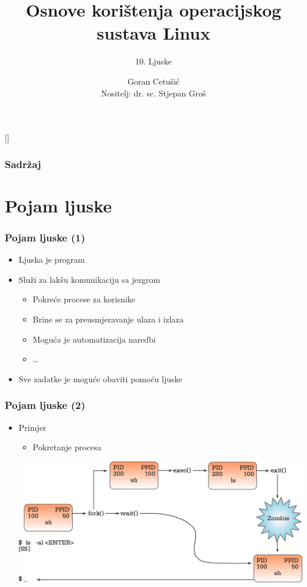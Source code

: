 \documentclass[table,usenames,dvipsnames]{beamer}
\title{Osnove korištenja operacijskog sustava Linux}
\subtitle{10. Ljuske}
\author[Goran Cetušić]{Goran Cetušić\\{\small Nositelj: dr. sc. Stjepan Groš}}
\institute[FER]{Sveučilište u Zagrebu \\
				Fakultet elektrotehnike i računarstva}
\date{\todayiso}
\begin{document}
{
[] %

\begin{frame}
\maketitle
\end{frame}
}

\begin{frame}
\frametitle{Sadržaj}
\tableofcontents
\end{frame}

\section{Pojam ljuske}
\begin{frame}[t]
\frametitle{Pojam ljuske (1)}
\begin{itemize}
  \item Ljuska je program
  \item Služi za lakšu komunikaciju sa jezgrom
  \begin{itemize}
    \item Pokreće procese za korisnike
    \item Brine se za preusmjeravanje ulaza i izlaza
    \item Moguća je automatizacija naredbi
    \item \ldots
  \end{itemize}
  \item Sve zadatke je moguće obaviti pomoću ljuske
\end{itemize}
\end{frame}

\begin{frame}[t]
\frametitle{Pojam ljuske (2)}
\begin{itemize}
  \item Primjer
  \begin{itemize}
    \item Pokretanje procesa
  \end{itemize}
  \includegraphics[width=\linewidth]{process_start}
\end{itemize}
\end{frame}
\end{document}
